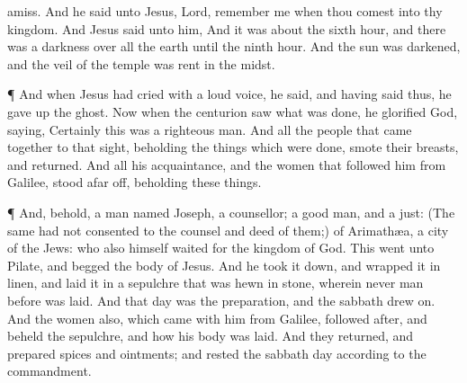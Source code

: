 {amiss.
And he
said unto
Jesus,
Lord,
remember
me
when thou
comest
into
thy
kingdom.
And
Jesus
said unto
him,
{}
And it
was
about the
sixth
hour,
and there
was a
darkness
over
all the
earth
until the
ninth
hour.
And the
sun was
darkened,
and the
veil of the
temple was
rent in the
midst.
\par }{\PP {}¶
And when
Jesus had
cried with a
loud
voice, he
said,
{}
and having
said
thus, he gave up the
ghost.
Now when the
centurion
saw
what was
done, he
glorified
God,
saying,
Certainly
this
was a
righteous
man.
And
all the
people
that came
together
to
that
sight,
beholding the things
which were
done,
smote
their
breasts, and
returned.
And
all
his
acquaintance,
and the
women
that
followed
him
from
Galilee,
stood afar
off,
beholding these
things.
\par }{\PP {}¶
And,
behold,
{} a
man
named
Joseph, a
counsellor;
{} a
good
man,
and a
just:
(The
same
had
not
consented to the
counsel
and
deed of
them;)
{}
of
Arimathæa, a
city of the
Jews:
who
also
himself
waited
for the
kingdom of
God.
This
{}
went unto
Pilate, and
begged the
body of
Jesus.
And
he took it
down, and
wrapped
it in
linen,
and
laid
it
in a
sepulchre that was hewn in
stone,
wherein
never
man
before
was
laid.
And that
day
was the
preparation,
and the
sabbath drew
on.
And the
women
also,
which
came with
him
from
Galilee, followed
after, and
beheld the
sepulchre,
and
how
his
body was
laid.
And they
returned, and
prepared
spices
and
ointments;
and
rested
the sabbath
day according
to the
commandment.

}

